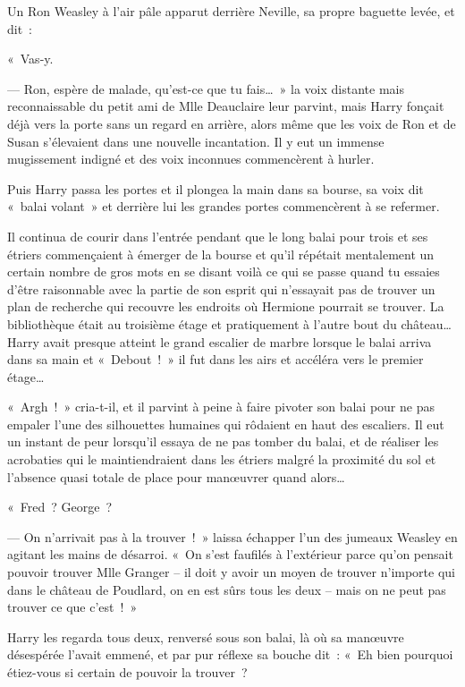 Un Ron Weasley à l'air pâle apparut derrière Neville, sa propre baguette levée, et dit~:

«~Vas-y.

--- Ron, espère de malade, qu'est-ce que tu fais…~» la voix distante mais reconnaissable du petit ami de Mlle Deauclaire leur parvint, mais Harry fonçait déjà vers la porte sans un regard en arrière, alors même que les voix de Ron et de Susan s'élevaient dans une nouvelle incantation. Il y eut un immense mugissement indigné et des voix inconnues commencèrent à hurler.

Puis Harry passa les portes et il plongea la main dans sa bourse, sa voix dit «~balai volant~» et derrière lui les grandes portes commencèrent à se refermer.

Il continua de courir dans l'entrée pendant que le long balai pour trois et ses étriers commençaient à émerger de la bourse et qu'il répétait mentalement un certain nombre de gros mots en se disant voilà ce qui se passe quand tu essaies d'être raisonnable avec la partie de son esprit qui n'essayait pas de trouver un plan de recherche qui recouvre les endroits où Hermione pourrait se trouver. La bibliothèque était au troisième étage et pratiquement à l'autre bout du château… Harry avait presque atteint le grand escalier de marbre lorsque le balai arriva dans sa main et «~Debout~!~» il fut dans les airs et accéléra vers le premier étage…

«~Argh~!~» cria-t-il, et il parvint à peine à faire pivoter son balai pour ne pas empaler l'une des silhouettes humaines qui rôdaient en haut des escaliers. Il eut un instant de peur lorsqu'il essaya de ne pas tomber du balai, et de réaliser les acrobaties qui le maintiendraient dans les étriers malgré la proximité du sol et l'absence quasi totale de place pour manœuvrer quand alors…

«~Fred~? George~?

--- On n'arrivait pas à la trouver~!~» laissa échapper l'un des jumeaux Weasley en agitant les mains de désarroi. «~On s'est faufilés à l'extérieur parce qu'on pensait pouvoir trouver Mlle Granger -- il doit y avoir un moyen de trouver n'importe qui dans le château de Poudlard, on en est sûrs tous les deux -- mais on ne peut pas trouver ce que c'est~!~»

Harry les regarda tous deux, renversé sous son balai, là où sa manœuvre désespérée l'avait emmené, et par pur réflexe sa bouche dit~: «~Eh bien pourquoi étiez-vous si certain de pouvoir la trouver~?

